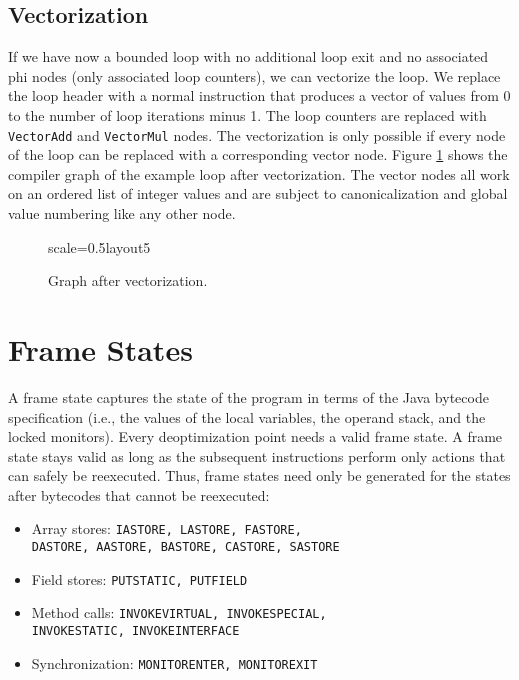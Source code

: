 \documentclass[twocolumn]{svjour3}
\begin{document}
\subsection{Vectorization}

If we have now a bounded loop with no additional loop exit and no associated phi nodes (only associated loop counters), we can vectorize the loop.
We replace the loop header with a normal instruction that produces a vector of values from 0 to the number of loop iterations minus 1.
The loop counters are replaced with \texttt{VectorAdd} and \texttt{VectorMul} nodes.
The vectorization is only possible if every node of the loop can be replaced with a corresponding vector node.
Figure \ref{fig:loop5} shows the compiler graph of the example loop after vectorization.
The vector nodes all work on an ordered list of integer values and are subject to canonicalization and global value numbering like any other node.


\begin{figure}[h]
  \centering
\begin{digraphenv}{scale=0.5}{layout5}
\end{digraphenv}
  \caption{Graph after vectorization.}
  \label{fig:loop5}
\end{figure}


\section{Frame States}
A frame state captures the state of the program in terms of the Java bytecode specification (i.e., the values of the local variables, the operand stack, and the locked monitors).
Every deoptimization point needs a valid frame state.
A frame state stays valid as long as the subsequent instructions perform only actions that can safely be reexecuted.
Thus, frame states need only be generated for the states after bytecodes that cannot be reexecuted:

\begin{itemize}
    \item Array stores: {\tt IASTORE, LASTORE, FASTORE, \\DASTORE, AASTORE, BASTORE, CASTORE, SASTORE}
    \item Field stores: {\tt PUTSTATIC, PUTFIELD}
    \item Method calls: {\tt INVOKEVIRTUAL, INVOKESPECIAL, \\INVOKESTATIC, INVOKEINTERFACE}
    \item Synchronization: {\tt MONITORENTER, MONITOREXIT}
\end{itemize}
\end{document}
